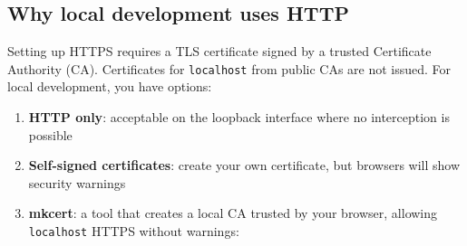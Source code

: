 \subsection*{Why local development uses HTTP}\label{11-reliability-security-gaps:why-local-development-uses-http}

Setting up HTTPS requires a TLS certificate signed by a trusted Certificate Authority (CA). Certificates for \texttt{localhost} from public CAs are not issued. For local development, you have options:

\begin{enumerate}
\def\labelenumi{\arabic{enumi}.}
\tightlist
\item
  \textbf{HTTP only}: acceptable on the loopback interface where no interception is possible
\item
  \textbf{Self-signed certificates}: create your own certificate, but browsers will show security warnings
\item
  \textbf{mkcert}: a tool that creates a local CA trusted by your browser, allowing \texttt{localhost} HTTPS without warnings:
\end{enumerate}

\begin{codebox}[short]

\begin{Shaded}
\begin{Highlighting}[]
   
\end{Highlighting}
\end{Shaded}

\end{codebox}

\begin{codebox}[short]

\begin{Shaded}
\begin{Highlighting}[]

\OperatorTok{=}\NormalTok{)}

  \OperatorTok{==} \NormalTok{:}
\OperatorTok{=}\NormalTok{(}\NormalTok{, }\NormalTok{))}
\end{Highlighting}
\end{Shaded}

\end{codebox}


